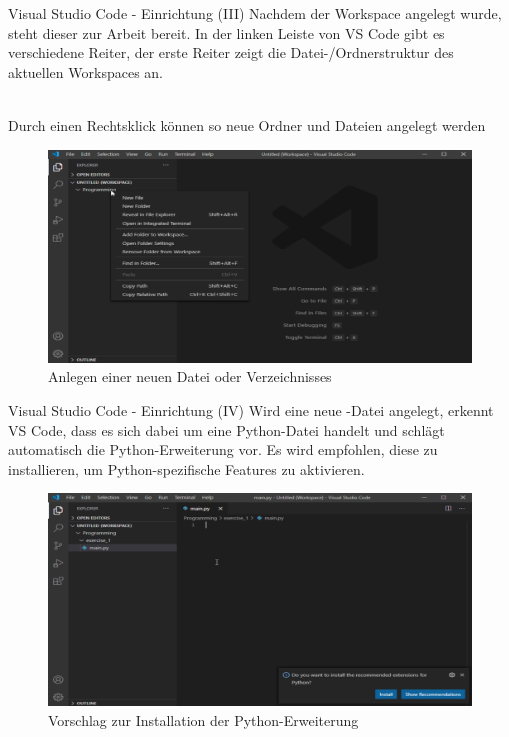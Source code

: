     \begin{frame}{Visual Studio Code - Einrichtung (III)}
        Nachdem der Workspace angelegt wurde, steht dieser zur Arbeit bereit. In der linken Leiste von VS Code gibt es verschiedene Reiter, der erste Reiter zeigt die Datei-/Ordnerstruktur des aktuellen Workspaces an. \\~\
        
        Durch einen Rechtsklick können so neue Ordner und Dateien angelegt werden
        
        \begin{figure}
            \centering
            \includegraphics[keepaspectratio, width=0.9\linewidth]{chapters/08_ide/figures/vs_code_create_file.png}
            \caption{Anlegen einer neuen Datei oder Verzeichnisses}
        \end{figure}
    \end{frame}
    
     \begin{frame}{Visual Studio Code - Einrichtung (IV)}
        Wird eine neue -Datei angelegt, erkennt VS Code, dass es sich dabei um eine Python-Datei handelt und schlägt automatisch die Python-Erweiterung vor. Es wird empfohlen, diese zu installieren, um Python-spezifische Features zu aktivieren.
        
        \begin{figure}
            \centering
            \includegraphics[keepaspectratio, width=0.9\linewidth]{chapters/08_ide/figures/vs_code_python.png}
            \caption{Vorschlag zur Installation der Python-Erweiterung}
        \end{figure}
        
    \end{frame}
    
